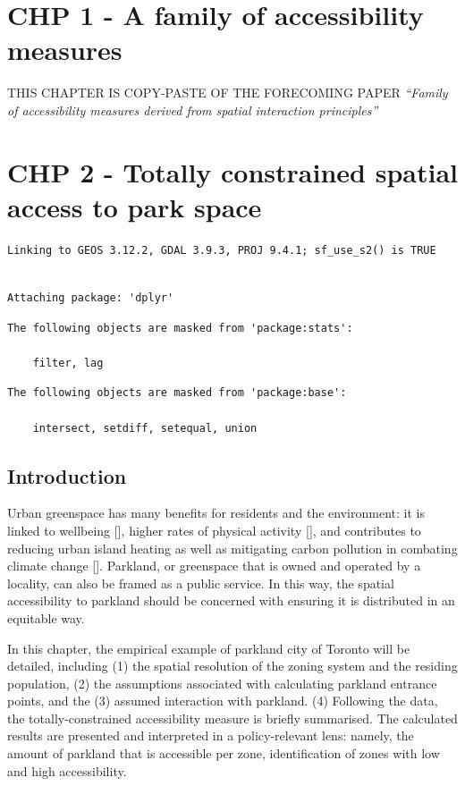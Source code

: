 \documentclass[
11pt, %
oneside, %
english, %
singlespacing, %
]{macthesis} %
\begin{document}
\chapter{CHP 1 - A family of accessibility measures}\label{chp-1---a-family-of-accessibility-measures}

THIS CHAPTER IS COPY-PASTE OF THE FORECOMING PAPER \emph{``Family of accessibility measures derived from spatial interaction principles''}

\chapter{CHP 2 - Totally constrained spatial access to park space}\label{chp-2---totally-constrained-spatial-access-to-park-space}

\begin{verbatim}
Linking to GEOS 3.12.2, GDAL 3.9.3, PROJ 9.4.1; sf_use_s2() is TRUE
\end{verbatim}

\begin{verbatim}

Attaching package: 'dplyr'
\end{verbatim}

\begin{verbatim}
The following objects are masked from 'package:stats':

    filter, lag
\end{verbatim}

\begin{verbatim}
The following objects are masked from 'package:base':

    intersect, setdiff, setequal, union
\end{verbatim}

\section{Introduction}\label{introduction}

Urban greenspace has many benefits for residents and the environment: it is linked to wellbeing {[}{]}, higher rates of physical activity {[}{]}, and contributes to reducing urban island heating as well as mitigating carbon pollution in combating climate change {[}{]}. Parkland, or greenspace that is owned and operated by a locality, can also be framed as a public service. In this way, the spatial accessibility to parkland should be concerned with ensuring it is distributed in an equitable way.

In this chapter, the empirical example of parkland city of Toronto will be detailed, including (1) the spatial resolution of the zoning system and the residing population, (2) the assumptions associated with calculating parkland entrance points, and the (3) assumed interaction with parkland. (4) Following the data, the totally-constrained accessibility measure is briefly summarised. The calculated results are presented and interpreted in a policy-relevant lens: namely, the amount of parkland that is accessible per zone, identification of zones with low and high accessibility.
\end{document}
